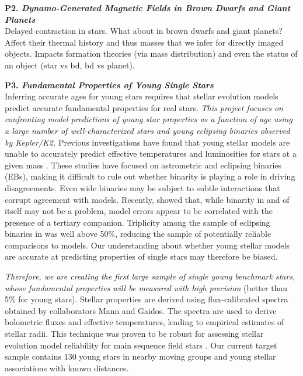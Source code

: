 \documentclass[12pt,a4paper]{article}
\begin{document}
\textbf{P2. \emph{Dynamo-Generated Magnetic Fields in Brown Dwarfs and Giant Planets}} \\
Delayed contraction in stars. What about in brown dwarfs and giant planets? Affect their thermal history and thus masses that we infer for directly imaged objects. Impacts formation theories (via mass distribution) and even the status of an object (star vs bd, bd vs planet).

\textbf{P3. \emph{Fundamental Properties of Young Single Stars}} \\
Inferring accurate ages for young stars requires that stellar evolution models predict accurate fundamental properties for real stars. {\it This project focuses on confronting model predictions of young star properties as a function of age using a large number of well-characterized stars and young eclipsing binaries observed by Kepler/K2.}
Previous investigations have found that young stellar models are unable to accurately predict effective temperatures and luminosities for stars at a given mass \citep[e.g.,][]{Hillenbrand2004, Mathieu2007, Stassun2014}. These studies have focused on astrometric and eclipsing binaries (EBs), making it difficult to rule out whether binarity is playing a role in driving disagreements. Even wide binaries may be subject to subtle interactions that corrupt agreement with models. Recently, \citet{Stassun2014} showed that, while binarity in and of itself may not be a problem, model errors appear to be correlated with the presence of a tertiary companion. Triplicity among the sample of eclipsing binaries in \citet{Stassun2014} was well above 50\%, reducing the sample of potentially reliable comparisons to models. Our understanding about whether young stellar models are accurate at predicting properties of single stars may therefore be biased.

{\it Therefore, we are creating the first large sample of single young benchmark stars, whose fundamental properties will be measured with high precision} (better than 5\% for young stars). Stellar properties are derived using flux-calibrated spectra obtained by collaborators Mann and Gaidos. The spectra are used to derive bolometric fluxes and effective temperatures, leading to empirical estimates of stellar radii. This technique was proven to be robust for assessing stellar evolution model reliability for main sequence field stars \citep{Mann2015b}. Our current target sample contains 130 young stars in nearby moving groups and young stellar associations with known distances.
\end{document}
